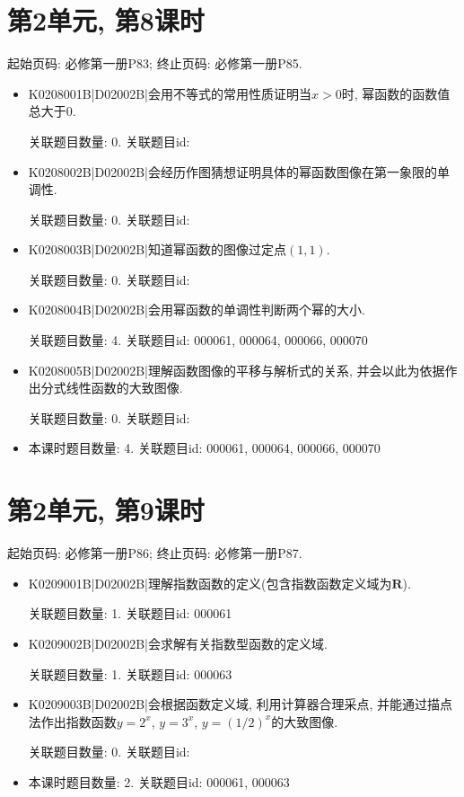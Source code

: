 \section*{第2单元, 第8课时}
起始页码: 必修第一册P83; 终止页码: 必修第一册P85.
\begin{itemize}
\item K0208001B|D02002B|会用不等式的常用性质证明当$x>0$时, 幂函数的函数值总大于$0$.

关联题目数量: 0. 关联题目id: 

\item K0208002B|D02002B|会经历作图猜想证明具体的幂函数图像在第一象限的单调性.

关联题目数量: 0. 关联题目id: 

\item K0208003B|D02002B|知道幂函数的图像过定点$(1,1)$.

关联题目数量: 0. 关联题目id: 

\item K0208004B|D02002B|会用幂函数的单调性判断两个幂的大小.

关联题目数量: 4. 关联题目id: 000061, 000064, 000066, 000070

\item K0208005B|D02002B|理解函数图像的平移与解析式的关系, 并会以此为依据作出分式线性函数的大致图像.

关联题目数量: 0. 关联题目id: 

\item 本课时题目数量: 4. 关联题目id: 000061, 000064, 000066, 000070

\end{itemize}

\section*{第2单元, 第9课时}
起始页码: 必修第一册P86; 终止页码: 必修第一册P87.
\begin{itemize}
\item K0209001B|D02002B|理解指数函数的定义(包含指数函数定义域为$\mathbf{R}$).

关联题目数量: 1. 关联题目id: 000061

\item K0209002B|D02002B|会求解有关指数型函数的定义域.

关联题目数量: 1. 关联题目id: 000063

\item K0209003B|D02002B|会根据函数定义域, 利用计算器合理采点, 并能通过描点法作出指数函数$y=2^{x}$, $y=3^{x}$, $y=(1/2)^{x}$的大致图像.

关联题目数量: 0. 关联题目id: 

\item 本课时题目数量: 2. 关联题目id: 000061, 000063

\end{itemize}

